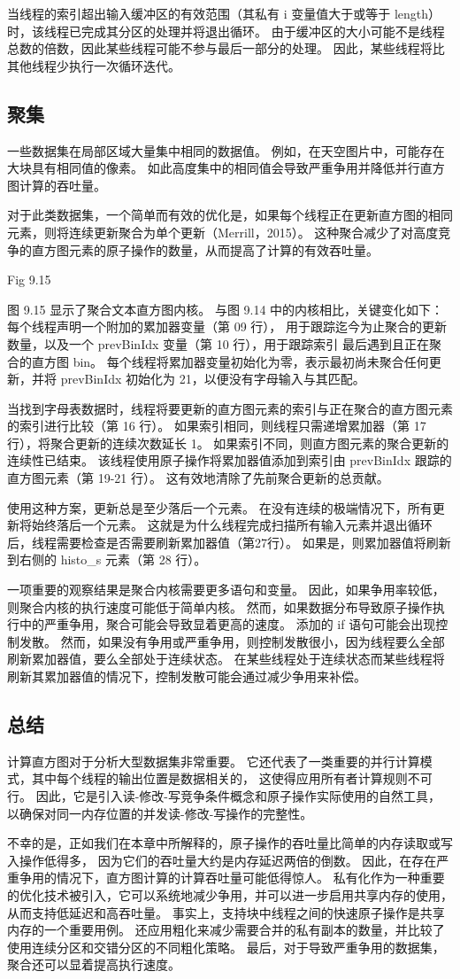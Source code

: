 当线程的索引超出输入缓冲区的有效范围（其私有 i 变量值大于或等于 length）时，该线程已完成其分区的处理并将退出循环。 
由于缓冲区的大小可能不是线程总数的倍数，因此某些线程可能不参与最后一部分的处理。 
因此，某些线程将比其他线程少执行一次循环迭代。

\subsection{聚集}
一些数据集在局部区域大量集中相同的数据值。 例如，在天空图片中，可能存在大块具有相同值的像素。 
如此高度集中的相同值会导致严重争用并降低并行直方图计算的吞吐量。

对于此类数据集，一个简单而有效的优化是，如果每个线程正在更新直方图的相同元素，则将连续更新聚合为单个更新（Merrill，2015）。 
这种聚合减少了对高度竞争的直方图元素的原子操作的数量，从而提高了计算的有效吞吐量。

{\color{red} Fig 9.15}

图 9.15 显示了聚合文本直方图内核。 与图 9.14 中的内核相比，关键变化如下：每个线程声明一个附加的累加器变量（第 09 行），
用于跟踪迄今为止聚合的更新数量，以及一个 prevBinIdx 变量（第 10 行），用于跟踪索引 最后遇到且正在聚合的直方图 bin。 
每个线程将累加器变量初始化为零，表示最初尚未聚合任何更新，并将 prevBinIdx 初始化为 21，以便没有字母输入与其匹配。

当找到字母表数据时，线程将要更新的直方图元素的索引与正在聚合的直方图元素的索引进行比较（第 16 行）。 
如果索引相同，则线程只需递增累加器（第 17 行），将聚合更新的连续次数延长 1。 
如果索引不同，则直方图元素的聚合更新的连续性已结束。 
该线程使用原子操作将累加器值添加到索引由 prevBinIdx 跟踪的直方图元素（第 19-21 行）。 这有效地清除了先前聚合更新的总贡献。

使用这种方案，更新总是至少落后一个元素。 在没有连续的极端情况下，所有更新将始终落后一个元素。 
这就是为什么线程完成扫描所有输入元素并退出循环后，线程需要检查是否需要刷新累加器值（第27行）。 
如果是，则累加器值将刷新到右侧的 histo\_s 元素（第 28 行）。

一项重要的观察结果是聚合内核需要更多语句和变量。 因此，如果争用率较低，则聚合内核的执行速度可能低于简单内核。 
然而，如果数据分布导致原子操作执行中的严重争用，聚合可能会导致显着更高的速度。 添加的 if 语句可能会出现控制发散。 
然而，如果没有争用或严重争用，则控制发散很小，因为线程要么全部刷新累加器值，要么全部处于连续状态。 
在某些线程处于连续状态而某些线程将刷新其累加器值的情况下，控制发散可能会通过减少争用来补偿。

\subsection{总结}
计算直方图对于分析大型数据集非常重要。 它还代表了一类重要的并行计算模式，其中每个线程的输出位置是数据相关的，
这使得应用所有者计算规则不可行。 因此，它是引入读-修改-写竞争条件概念和原子操作实际使用的自然工具，
以确保对同一内存位置的并发读-修改-写操作的完整性。

不幸的是，正如我们在本章中所解释的，原子操作的吞吐量比简单的内存读取或写入操作低得多，
因为它们的吞吐量大约是内存延迟两倍的倒数。 因此，在存在严重争用的情况下，直方图计算的计算吞吐量可能低得惊人。 
私有化作为一种重要的优化技术被引入，它可以系统地减少争用，并可以进一步启用共享内存的使用，从而支持低延迟和高吞吐量。 
事实上，支持块中线程之间的快速原子操作是共享内存的一个重要用例。 
还应用粗化来减少需要合并的私有副本的数量，并比较了使用连续分区和交错分区的不同粗化策略。 
最后，对于导致严重争用的数据集，聚合还可以显着提高执行速度。

